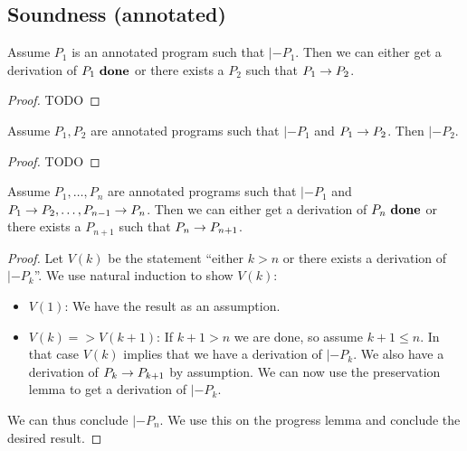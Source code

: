 \subsection{Soundness (annotated)}

\begin{lemma}[Progress]
  \label{thm:progress}
  Assume $P_1$ is an annotated program such that $|- P_1$.
  Then we can either get a derivation of ${P_1}\ \mathbf{done}$ or there exists
  a $P_2$ such that ${P_1} -> {P_2}$.
\end{lemma}
\begin{proof}
  TODO
\end{proof}

\begin{lemma}[Preservation]
  \label{thm:reduction}
  Assume $P_1, P_2$ are annotated programs such that $|- P_1$ and
  ${P_1} -> {P_2}$. Then $|- P_2$.
\end{lemma}
\begin{proof}
  TODO
\end{proof}

\begin{lemma}[Soundness]
  \label{thm:soundness}
  Assume $P_1, \dots, P_n$ are annotated programs such that $|- P_1$ and
  ${P_1} -> {P_2}, \dots, {P_{n-1}} -> {P_n}$. Then we can either get a
  derivation of ${P_n}\ \mathbf{done}$ or there exists a $P_{n+1}$ such that
  ${P_n} -> {P_{n+1}}$.
\end{lemma}
\begin{proof}
  Let $V(k)$ be the statement ``either $k > n$ or there exists a derivation of
  $|- P_k$''. We use natural induction to show $V(k)$:

  \begin{itemize}
  \item $V(1)$: We have the result as an assumption.
  \item $V(k) => V(k+1)$: If $k+1 > n$ we are done, so assume $k+1 \le n$. In
    that case $V(k)$ implies that we have a derivation of $|- P_k$. We also have
    a derivation of ${P_k} -> {P_{k+1}}$ by assumption. We can now use the
    preservation lemma to get a derivation of $|- P_k$.
  \end{itemize}

  We can thus conclude $|- P_n$. We use this on the progress lemma and conclude
  the desired result.
\end{proof}

